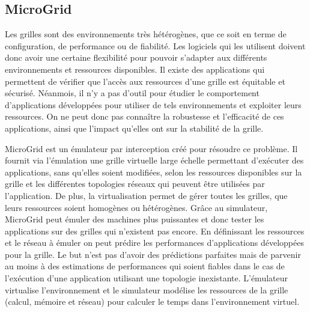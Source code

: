 \subsection{MicroGrid}
\label{subsection:MicroGrid}

Les grilles sont des environnements très hétérogènes, que ce soit en terme de configuration, de performance ou de fiabilité. Les logiciels qui les utilisent doivent donc avoir une certaine flexibilité pour pouvoir s'adapter aux différents environnements et ressources disponibles. Il existe des applications qui permettent de vérifier que l'accès aux ressources d'une grille est équitable et sécurisé. Néanmois, il n'y a pas d'outil pour étudier le comportement d'applications développées pour utiliser de tels environnements et exploiter leurs ressources. On ne peut donc pas connaître la robustesse et l'efficacité de ces applications, ainsi que l'impact qu'elles ont sur la stabilité de la grille. 

MicroGrid \citep{MICROGRID_INIT, MICROGRID_CASANOVA} est un émulateur par interception créé pour résoudre ce problème. Il fournit via l'émulation une grille virtuelle large échelle permettant d'exécuter des applications, sans qu'elles soient modifiées, selon les ressources disponibles sur la grille et les différentes topologies réseaux qui peuvent être utilisées par l'application. De plus, la virtualisation permet de gérer toutes les grilles, que leurs ressources soient homogènes ou hétérogènes. Grâce au simulateur, %
MicroGrid peut émuler des machines plus puissantes et donc tester les applications sur des grilles qui n'existent pas encore. En définissant les ressources et le réseau à émuler on peut prédire les performances d'applications développées pour la grille. Le but n'est pas d'avoir des prédictions parfaites mais de parvenir au moins à des estimations de performances qui soient fiables dans le cas de l'exécution d'une application utilisant une topologie inexistante. L'émulateur virtualise l'environnement et le simulateur modélise les ressources de la grille (calcul, mémoire et réseau) pour calculer le temps dans l'environnement virtuel.

